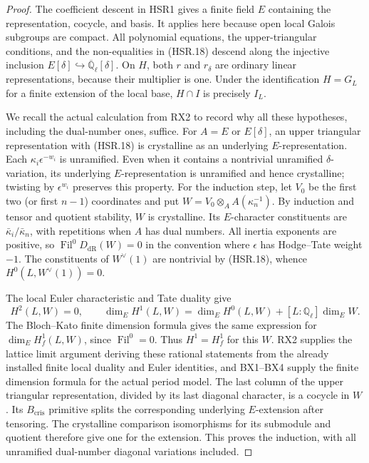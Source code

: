 \documentclass[11pt,a4paper]{article}
\numberwithin{equation}{section}
\theoremstyle{remark}\newtheorem{remark}[theorem]{Remark}
\begin{document}
\begin{proof}
The coefficient descent in HSR1 gives a finite field $E$ containing
the representation, cocycle, and basis.  It applies here because
open local Galois subgroups are compact.  All polynomial equations,
the upper-triangular conditions, and the non-equalities in
(HSR.18) descend along the injective inclusion
$E[\delta]\hookrightarrow\overline{\mathbb Q}_\ell[\delta]$.
On $H$, both $r$ and $r_\delta$ are ordinary linear
representations, because their multiplier is one.  Under the
identification $H=G_L$ for a finite extension of the local base,
$H\cap I$ is precisely $I_L$.

We recall the actual calculation from RX2 to record why all these
hypotheses, including the dual-number ones, suffice.  For
$A=E$ or $E[\delta]$, an upper triangular representation with
(HSR.18) is crystalline as an underlying $E$-representation.
Each $\kappa_i\epsilon^{-w_i}$ is unramified.  Even when it
contains a nontrivial unramified $\delta$-variation, its underlying
$E$-representation is unramified and hence crystalline; twisting
by $\epsilon^{w_i}$ preserves this property.  For the induction
step, let $V_0$ be the first two (or first $n-1$) coordinates and
put $W=V_0\otimes_A A(\kappa_n^{-1})$.  By induction and tensor
and quotient stability, $W$ is crystalline.  Its $E$-character
constituents are $\bar\kappa_i/\bar\kappa_n$, with repetitions
when $A$ has dual numbers.  All inertia exponents are positive,
so $\operatorname{Fil}^0D_{\mathrm{dR}}(W)=0$ in the convention
where $\epsilon$ has Hodge--Tate weight $-1$.
The constituents of $W^\vee(1)$ are nontrivial by (HSR.18),
whence $H^0(L,\allowbreak{} W^\vee(1))=0$.

The local Euler characteristic and Tate duality give
\[
 H^2(L,\allowbreak{} W)=0,\qquad
 \dim_E H^1(L,\allowbreak{} W)=\dim_E H^0(L,\allowbreak{} W)+[L:\mathbb Q_\ell]\dim_EW.
\]
The Bloch--Kato finite dimension formula gives the same expression
for $\dim_EH^1_f(L,\allowbreak{} W)$, since $\operatorname{Fil}^0=0$.
Thus $H^1=H^1_f$ for this $W$.  RX2 supplies the lattice limit
argument deriving these rational statements from the already
installed finite local duality and Euler identities, and BX1--BX4
supply the finite dimension formula for the actual period model.
The last column of the upper triangular representation, divided
by its last diagonal character, is a cocycle in $W$.  Its
$B_{\mathrm{cris}}$ primitive splits the corresponding underlying
$E$-extension after tensoring.  The crystalline comparison
isomorphisms for its submodule and quotient therefore give one
for the extension.  This proves the induction, with all
unramified dual-number diagonal variations included.


\end{proof}
\end{document}
